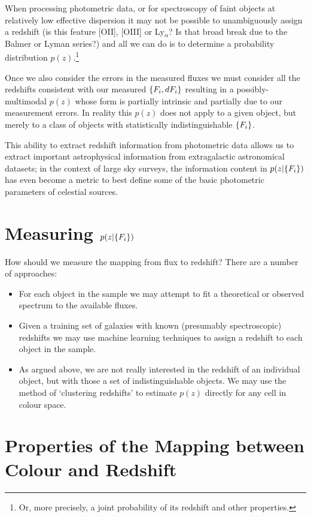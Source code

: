\documentclass[12pt]{article}
\begin{document}
When processing photometric data, or for spectroscopy of faint objects at relatively low effective dispersion
it may not be possible to unambiguously assign a redshift (is this feature [OII], [OIII] or Ly$_\alpha$?  Is
that broad break due to the Balmer or Lyman series?) and all we can do is to determine a probability
distribution $p(z)$.\footnote{Or, more precisely, a joint probability of its redshift and other properties.}

Once we also consider the errors in the measured fluxes we must consider all the redshifts consistent with our
measured $\{F_i, dF_i\}$ resulting in a possibly-multimodal $p(z)$ whose form is partially intrinsic and partially due
to our measurement errors.  In reality this $p(z)$ does not apply to a given object, but merely to a class of
objects with statistically indistinguishable $\{F_i\}$.

This ability to extract redshift information from photometric data allows us to extract
important astrophysical information from extragalactic astronomical datasets; in the context of large sky
surveys, the information content in $p(z | \{F_i\})$ has even become a metric to best define some of the basic photometric parameters of celestial sources.

\section{Measuring $p(z | \{F_i\})$}

How should we measure the mapping from flux to redshift?  There are a number of approaches:

\begin{itemize}
\item
  For each object in the sample we may attempt to fit a theoretical or observed spectrum to
  the available fluxes.

\item
  Given a training set of galaxies with known (presumably spectroscopic) redshifts we may use machine learning
  techniques to assign a redshift to each object in the sample.

\item
  As argued above, we are not really interested in the redshift of an individual object, but with
  those a set of indistinguishable objects.  We may use the method of `clustering redshifts' to
  estimate $p(z)$ directly for any cell in colour space.
\end{itemize}

\section{Properties of the Mapping between Colour and Redshift}
\end{document}
